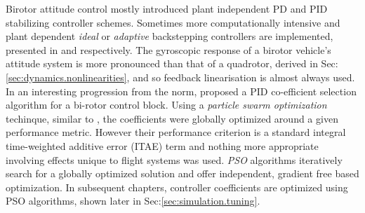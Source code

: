 Birotor attitude control mostly introduced plant independent PD \cite{obliquepitch} and PID \cite{tiltrotorUAV} stabilizing controller schemes. Sometimes more computationally intensive and plant dependent \emph{ideal} or \emph{adaptive} backstepping controllers are implemented, presented in \cite{smalltwotilting,tpheonix} and \cite{adaptivebackstep} respectively. The gyroscopic response of a birotor vehicle's attitude system is more pronounced than that of a quadrotor, derived in Sec:\ref{sec:dynamics.nonlinearities}, and so feedback linearisation is almost always used. In an interesting progression from the norm, \cite{autopilotPSO} proposed a PID co-efficient selection algorithm for a bi-rotor control block. Using a \emph{particle swarm optimization} techinque, similar to \cite{adaptivepso}, the coefficients were globally optimized around a given performance metric. However their performance criterion is a standard integral time-weighted additive error (ITAE) term and nothing more appropriate involving effects unique to flight systems was used. \emph{PSO} algorithms iteratively search for a globally optimized solution and offer independent, gradient free based optimization. In subsequent chapters, controller coefficients are optimized using PSO algorithms, shown later in Sec:\ref{sec:simulation.tuning}.
\par
